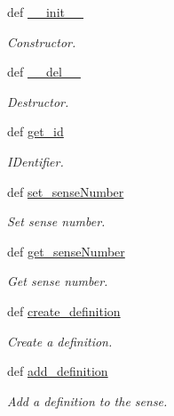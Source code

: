 \begin{DoxyCompactItemize}
\item 
def \hyperlink{classlmf_1_1src_1_1core_1_1sense_1_1_sense_af0279b132d98c7b49141350ce34ea53b}{\+\_\+\+\_\+init\+\_\+\+\_\+}
\begin{DoxyCompactList}\small\item\em Constructor. \end{DoxyCompactList}\item 
def \hyperlink{classlmf_1_1src_1_1core_1_1sense_1_1_sense_a3cc439d56624626aaec6588dbcad5b58}{\+\_\+\+\_\+del\+\_\+\+\_\+}
\begin{DoxyCompactList}\small\item\em Destructor. \end{DoxyCompactList}\item 
def \hyperlink{classlmf_1_1src_1_1core_1_1sense_1_1_sense_aca94be206f4da6635798c1423aa5db15}{get\+\_\+id}
\begin{DoxyCompactList}\small\item\em I\+Dentifier. \end{DoxyCompactList}\item 
def \hyperlink{classlmf_1_1src_1_1core_1_1sense_1_1_sense_a144abbf38354979624e6b6902bd86cb7}{set\+\_\+sense\+Number}
\begin{DoxyCompactList}\small\item\em Set sense number. \end{DoxyCompactList}\item 
def \hyperlink{classlmf_1_1src_1_1core_1_1sense_1_1_sense_a0c1c636cbbcb1fd1e98e9f5058464d73}{get\+\_\+sense\+Number}
\begin{DoxyCompactList}\small\item\em Get sense number. \end{DoxyCompactList}\item 
def \hyperlink{classlmf_1_1src_1_1core_1_1sense_1_1_sense_a5923d173a0ad52642ccdc50d4611fdc9}{create\+\_\+definition}
\begin{DoxyCompactList}\small\item\em Create a definition. \end{DoxyCompactList}\item 
def \hyperlink{classlmf_1_1src_1_1core_1_1sense_1_1_sense_a28ac5eef8b1d952ee565792e56a1b748}{add\+\_\+definition}
\begin{DoxyCompactList}\small\item\em Add a definition to the sense. \end{DoxyCompactList}\item 

\end{DoxyCompactItemize}

